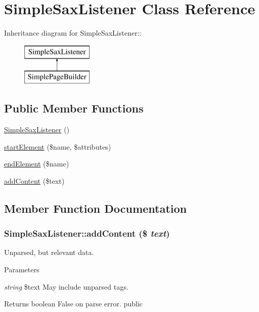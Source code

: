 \hypertarget{class_simple_sax_listener}{
\section{SimpleSaxListener Class Reference}
\label{class_simple_sax_listener}
}
Inheritance diagram for SimpleSaxListener::\begin{figure}[H]
\begin{center}
\leavevmode
\includegraphics[height=2cm]{class_simple_sax_listener}
\end{center}
\end{figure}
\subsection*{Public Member Functions}
\begin{DoxyCompactItemize}
\item 
\hyperlink{class_simple_sax_listener_ae114be1674844632a1f2f8362bf93018}{SimpleSaxListener} ()
\item 
\hyperlink{class_simple_sax_listener_a9094543df0d68dfa168c08087f8c868f}{startElement} (\$name, \$attributes)
\item 
\hyperlink{class_simple_sax_listener_abfa321e2d3edcf3f00b585c8b26e46cb}{endElement} (\$name)
\item 
\hyperlink{class_simple_sax_listener_a37d761543d4dc6030888c76963cb8ed1}{addContent} (\$text)
\end{DoxyCompactItemize}


\subsection{Member Function Documentation}
\hypertarget{class_simple_sax_listener_a37d761543d4dc6030888c76963cb8ed1}{
\subsubsection[{addContent}]{\setlength{\rightskip}{0pt plus 5cm}SimpleSaxListener::addContent (\$ {\em text})}}
\label{class_simple_sax_listener_a37d761543d4dc6030888c76963cb8ed1}
Unparsed, but relevant data. 
\begin{DoxyParams}{Parameters}
\item[{\em string}]\$text May include unparsed tags. \end{DoxyParams}
\begin{DoxyReturn}{Returns}
boolean False on parse error.  public 
\end{DoxyReturn}



